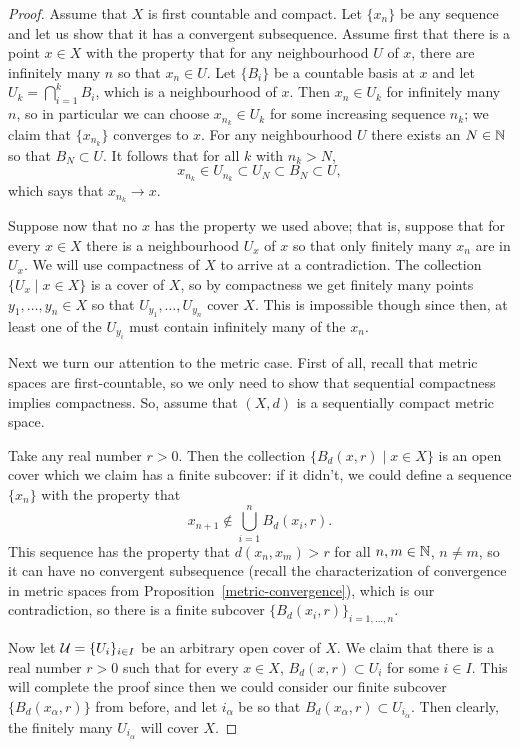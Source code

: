 \begin{proof}
  Assume that $X$ is first countable and compact. Let $\{x_n\}$ be any sequence and let us show that it has a convergent subsequence. Assume first that there is a point $x \in X$ with the property that for any neighbourhood $U$ of $x$, there are infinitely many $n$ so that $x_n \in U$. Let $\{B_i\}$ be a countable basis at $x$ and let $U_k = \bigcap_{i=1}^k B_i$, which is a neighbourhood of $x$. Then $x_n \in U_k$ for infinitely many $n$, so in particular we can choose $x_{n_k} \in U_k$ for some increasing sequence $n_k$; we claim that $\{x_{n_k}\}$ converges to $x$.  For any neighbourhood $U$ there exists an $N \in \mathbb{N}$ so that $B_N \subset U$. It follows that for all $k$ with $n_k > N$,
  \[
    x_{n_k} \in U_{n_k} \subset U_N \subset B_N \subset U,
  \]
  which says that $x_{n_k} \to x$.
  
  Suppose now that no $x$ has the property we used above; that is, suppose that for every $x \in X$ there is a neighbourhood $U_x$ of $x$ so that only finitely many $x_n$ are in $U_x$. We will use compactness of $X$ to arrive at a contradiction. The collection $\{U_x \mid x \in X\}$ is a cover of $X$, so by compactness we get finitely many points $y_1, \dots, y_n \in X$ so that $U_{y_1}, \dots, U_{y_n}$ cover $X$. This is impossible though since then, at least one of the $U_{y_i}$ must contain infinitely many of the $x_n$.
  
  Next we turn our attention to the metric case. First of all, recall that metric spaces are first-countable, so we only need to show that sequential compactness implies compactness. So, assume that $(X,d)$ is a sequentially compact metric space.
  
  Take any real number $r > 0$. Then the collection $\{B_d(x,r) \mid x \in X\}$ is an open cover which we claim has a finite subcover: if it didn't, we could define a sequence $\{x_n\}$ with the property that
  \[
    x_{n+1} \notin \bigcup_{i=1}^n B_d(x_i,r).
  \]
  This sequence has the property that $d(x_n,x_m) > r$ for all $n, m \in \mathbb{N}$, $n \not= m$, so it can have no convergent subsequence (recall the characterization of convergence in metric spaces from Proposition~\ref{metric-convergence}), which is our contradiction, so there is a finite subcover $\{B_d(x_i,r)\}_{i=1,\dots,n}$.
  
  Now let $\mathcal{U} = \{U_i\}_{i \in I}$ be an arbitrary open cover of $X$. We claim that there is a real number $r > 0$ such that for every $x \in X$, $B_d(x,r) \subset U_i$ for some $i \in I$. This will complete the proof since then we could consider our finite subcover $\{B_d(x_\alpha,r)\}$ from before, and let $i_\alpha$ be so that $B_d(x_\alpha,r) \subset U_{i_\alpha}$. Then clearly, the finitely many $U_{i_\alpha}$ will cover $X$.
  

\end{proof}
